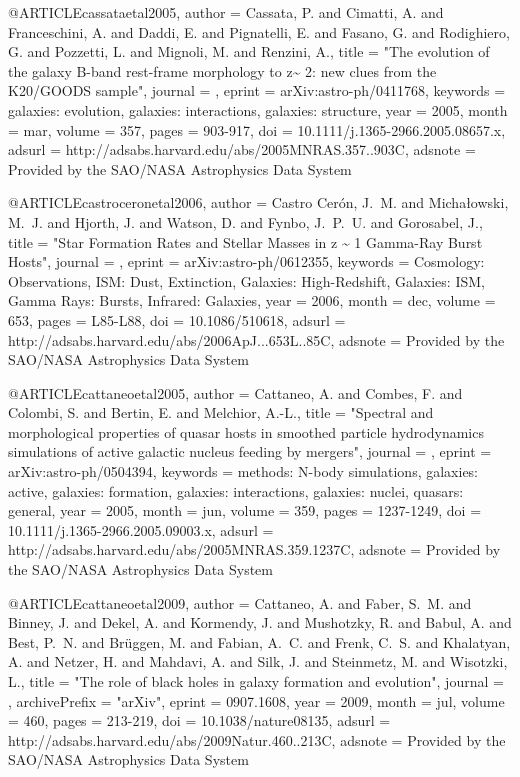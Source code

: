 {{{{{{{{{{{{{@ARTICLE{cassataetal2005,
   author = {{Cassata}, P. and {Cimatti}, A. and {Franceschini}, A. and {Daddi}, E. and 
	{Pignatelli}, E. and {Fasano}, G. and {Rodighiero}, G. and {Pozzetti}, L. and 
	{Mignoli}, M. and {Renzini}, A.},
    title = "{The evolution of the galaxy B-band rest-frame morphology to z\~{} 2: new clues from the K20/GOODS sample}",
  journal = {\mnras},
   eprint = {arXiv:astro-ph/0411768},
 keywords = {galaxies: evolution, galaxies: interactions, galaxies: structure},
     year = 2005,
    month = mar,
   volume = 357,
    pages = {903-917},
      doi = {10.1111/j.1365-2966.2005.08657.x},
   adsurl = {http://adsabs.harvard.edu/abs/2005MNRAS.357..903C},
  adsnote = {Provided by the SAO/NASA Astrophysics Data System}
}


@ARTICLE{castroceronetal2006,
   author = {{Castro Cer{\'o}n}, J.~M. and {Micha{\l}owski}, M.~J. and {Hjorth}, J. and 
	{Watson}, D. and {Fynbo}, J.~P.~U. and {Gorosabel}, J.},
    title = "{Star Formation Rates and Stellar Masses in z \~{} 1 Gamma-Ray Burst Hosts}",
  journal = {\apjl},
   eprint = {arXiv:astro-ph/0612355},
 keywords = {Cosmology: Observations, ISM: Dust, Extinction, Galaxies: High-Redshift, Galaxies: ISM, Gamma Rays: Bursts, Infrared: Galaxies},
     year = 2006,
    month = dec,
   volume = 653,
    pages = {L85-L88},
      doi = {10.1086/510618},
   adsurl = {http://adsabs.harvard.edu/abs/2006ApJ...653L..85C},
  adsnote = {Provided by the SAO/NASA Astrophysics Data System}
}

@ARTICLE{cattaneoetal2005,
   author = {{Cattaneo}, A. and {Combes}, F. and {Colombi}, S. and {Bertin}, E. and 
	{Melchior}, {A.-L.}},
    title = "{Spectral and morphological properties of quasar hosts in smoothed particle hydrodynamics simulations of active galactic nucleus feeding by mergers}",
  journal = {\mnras},
   eprint = {arXiv:astro-ph/0504394},
 keywords = {methods: N-body simulations, galaxies: active, galaxies: formation, galaxies: interactions, galaxies: nuclei, quasars: general},
     year = 2005,
    month = jun,
   volume = 359,
    pages = {1237-1249},
      doi = {10.1111/j.1365-2966.2005.09003.x},
   adsurl = {http://adsabs.harvard.edu/abs/2005MNRAS.359.1237C},
  adsnote = {Provided by the SAO/NASA Astrophysics Data System}
}


@ARTICLE{cattaneoetal2009,
   author = {{Cattaneo}, A. and {Faber}, S.~M. and {Binney}, J. and {Dekel}, A. and 
	{Kormendy}, J. and {Mushotzky}, R. and {Babul}, A. and {Best}, P.~N. and 
	{Br{\"u}ggen}, M. and {Fabian}, A.~C. and {Frenk}, C.~S. and 
	{Khalatyan}, A. and {Netzer}, H. and {Mahdavi}, A. and {Silk}, J. and 
	{Steinmetz}, M. and {Wisotzki}, L.},
    title = "{The role of black holes in galaxy formation and evolution}",
  journal = {\nat},
archivePrefix = "arXiv",
   eprint = {0907.1608},
     year = 2009,
    month = jul,
   volume = 460,
    pages = {213-219},
      doi = {10.1038/nature08135},
   adsurl = {http://adsabs.harvard.edu/abs/2009Natur.460..213C},
  adsnote = {Provided by the SAO/NASA Astrophysics Data System}
}



}}}}}}}}}}}}}
